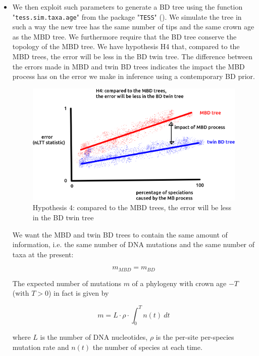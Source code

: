 \begin{itemize}
\item We then exploit such parameters to generate a BD tree 
using the function "\texttt{tess.sim.taxa.age}" 
from the package "\texttt{TESS}" (\cite{Hoehna2013}). 
We simulate the tree in such a way the new tree 
has the same number of tips and the same crown age as the MBD tree. 
We furthermore require that the BD tree conserve the topology of the MBD tree.
We have hypothesis H4 that, compared to the MBD trees, 
the error will be less in the BD twin tree.
The difference between the errors made in MBD and twin BD trees indicates
the impact the MBD process has on the error we make in inference using a
contemporary BD prior.

\begin{figure}[!htbp]
  \includegraphics[width=\textwidth]{fig_h_4.png}
  \caption{
    Hypothesis 4: compared to the MBD trees, 
    the error will be less in the BD twin tree
  }
  \label{fig:h_4}
\end{figure}


We want the MBD and twin BD trees to contain the same amount of information, 
i.e. the same number of DNA mutations and the same number of taxa at the present:

\begin{equation}
m_{MBD} = m_{BD} \label{m equivalence}
\end{equation} 

The expected number of mutations $m$ of a phylogeny 
with crown age $-T$ (with $T>0$) in fact is given by

\begin{equation}
m = L \cdot \rho \cdot \int_{0}^{T} n(t)\ dt \label{m calculation}
\end{equation}

where $L$ is the number of DNA nucleotides, 
$\rho$ is the per-site per-species mutation rate and
$n(t)$ the number of species at each time.


\end{itemize}
